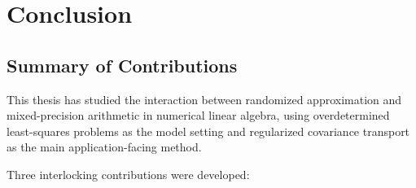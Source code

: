 \chapter{Conclusion} \label{ch:conclusion}

\section*{Summary of Contributions}

This thesis has studied the interaction between randomized approximation and
mixed-precision arithmetic in numerical linear algebra, using overdetermined
least-squares problems as the model setting and regularized covariance transport
as the main application-facing method.

Three interlocking contributions were developed:

